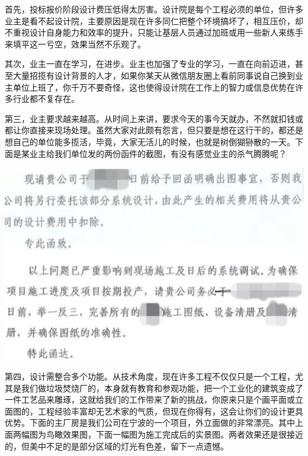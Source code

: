\documentclass[
]{book}
\begin{document}
首先，投标报价阶段设计费压低得太厉害。设计院是每个工程必须的单位，但许多业主是看不起设计院，主要原因是现在许多同仁把整个环境搞坏了，相互压价，却不重视设计自身能力和效率的提升，只能让基层人员通过加班或用一些新人来练手来填平这一亏空，效果当然不乐观了。

其次，业主一直在学习，在进步。业主也加强了专业的学习，一直在向前迈进，甚至大量招揽有设计背景的人才，如果你某天从微信朋友圈上看前同事说自己换到业主单位上班了，你千万不要奇怪，这也使得设计院在工作上的智力或信息优势在许多行业都不复存在。

第三，业主要求越来越高。从时间上来讲，要求今天的事今天就办，不然就扣钱或都让你直接来现场处理。虽然大家对此颇有怨言，但只要是想在这行干的，都还是想自己的单位能多揽活，毕竟，大家无活儿的时候，也就是树倒猢狲散的一天。下面是某业主给我们单位发的两份函件的截图，有没有感觉业主的杀气腾腾呢？

\includegraphics[width=8.33in]{images/sisi4}

第四，设计需整合多个功能。从技术角度，现在许多工程不仅仅只是一个工程，尤其是我们做垃圾焚烧厂的，本身就有教育和参观功能，把一个工业化的建筑变成了一件工艺品来雕琢，这就给我们的工作带来了新的挑战，你原来只是个画平面或立面图的，工程经验丰富却无艺术家的气质，但现在你得有，这会让你们的设计更具优势。下面的主厂房是我们公司在宁波的一个项目，外立面做的非常漂亮。其中上面两幅图为鸟瞰效果图，下面一幅图为施工完成后的实景图。两者效果还是很接近的，但美中不足的是部分区域的灯光有色差，留下一点遗憾。
\end{document}
